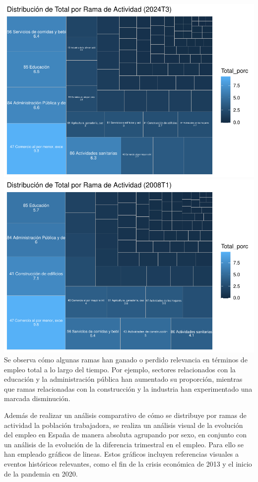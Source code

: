 \documentclass[notspecified,article,submit,moreauthors,pdftex]{Definitions/mdpi}
\begin{document}
\includegraphics{ProyectoAED2024_files/figure-latex/unnamed-chunk-38-1.pdf}
\includegraphics{ProyectoAED2024_files/figure-latex/unnamed-chunk-38-2.pdf}
Se observa cómo algunas ramas han ganado o perdido relevancia en
términos de empleo total a lo largo del tiempo. Por ejemplo, sectores
relacionados con la educación y la administración pública han aumentado
su proporción, mientras que ramas relacionadas con la construcción y la
industria han experimentado una marcada disminución.

Además de realizar un análisis comparativo de cómo se distribuye por
ramas de actividad la población trabajadora, se realiza un análisis
visual de la evolución del empleo en España de manera absoluta agrupando
por sexo, en conjunto con un análisis de la evolución de la diferencia
trimestral en el empleo. Para ello se han empleado gráficos de lineas.
Estos gráficos incluyen referencias visuales a eventos históricos
relevantes, como el fin de la crisis económica de 2013 y el inicio de la
pandemia en 2020.
\end{document}
